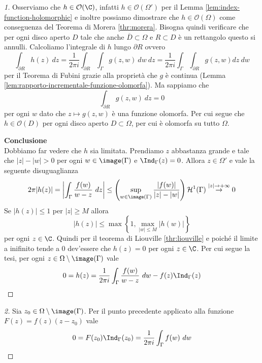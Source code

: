\begin{proof}[1]
    Osserviamo che $h \in \mathcal{O}(\C)$, infatti $h \in
    \mathcal{O}(\Omega')$ per il Lemma \ref{lem:index-function-holomorphic}
    e inoltre possiamo dimostrare che $h \in \mathcal{O}(\Omega)$ come
    conseguenza del Teorema di Morera \ref{thr:morera}. 
    Bisogna quindi verificare che per ogni disco aperto $D$ tale che anche 
    $\overline{D}\subset \Omega$ e $R \subset D$ è un rettangolo questo si
    annulli. Calcoliamo l'integrale di $h$ lungo $\partial R$ ovvero 
    \begin{equation*}
      \int_{\partial R} h(z)\ dz = \frac{1}{2\pi i} \int_{\partial
      R}\int_\Gamma g(z,w)\ dw\ dz = \frac{1}{2\pi i} \int_\Gamma
      \int_{\partial R} g(z,w) dz\ dw
    \end{equation*}
    per il Teorema di Fubini grazie alla proprietà che $g$ è continua (Lemma
    \ref{lem:rapporto-incrementale-funzione-olomorfa}). Ma sappiamo che 
    \begin{equation*}
      \int_{\partial R} g(z,w) \ dz = 0  
    \end{equation*}
    per ogni $w$ dato che $z \mapsto g(z,w)$ è una funzione olomorfa. Per
    cui segue che $h \in \mathcal{O}(D)$ per ogni disco aperto $D \subset
    \Omega$, per cui è olomorfa su tutto $\Omega$.

    \textbf{Conclusione}\\

    Dobbiamo far vedere che $h$ sia limitata. Prendiamo $z$ abbastanza
    grande e tale che $|z| - |w| > 0$ per ogni $w \in \image(\Gamma)$
    e $\Ind_\Gamma(z) = 0$. Allora $z \in \Omega'$ e vale la
    seguente disuguaglianza
    \begin{equation*}
      2\pi |h(z)| = \left|\int_\Gamma \frac{f(w)}{w-z}\ dz \right| \le
      \left( \sup_{w \in \image(\Gamma)} \frac{|f(w)|}{|z|-|w|} \right)
        \mathcal{H}^1(\Gamma) \overset{|z|\to+\infty}{\to} 0
    \end{equation*}
    Se $|h(z)| \le 1$ per $|z| \ge M$ allora 
    \begin{equation*}
      |h(z)| \le \max \left\{1,\max_{|w| \le M} |h(w)|\right\}
    \end{equation*}
    per ogni $z \in \C$. Quindi per il teorema di Liouville
    \ref{thr:liouville} e poiché il limite a inifinito tende a $0$
    dev'essere che $h(z) = 0$ per ogni $z \in \C$. Per cui segue la tesi, 
    per ogni $z \in \Omega \setminus \image(\Gamma)$ vale 
    \begin{equation*}
      0 = h(z) = \frac{1}{2 \pi i} \int_\Gamma \frac{f(w)}{w-z}\ dw - f(z)
      \Ind_\Gamma(z)  
    \end{equation*}
\end{proof}
\begin{proof}[2]
  Sia $z_0 \in \Omega \setminus \image(\Gamma)$. Per il punto precedente
    applicato alla funzione $F(z) = f(z)(z-z_0)$ vale
    \begin{equation*}
      0 = F(z_0)\Ind_\Gamma(z_0) = \frac{1}{2 \pi i}
      \int_\Gamma f(w)\ dw
    \end{equation*}
\end{proof}

